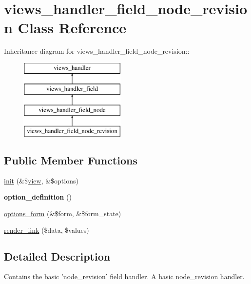 \hypertarget{classviews__handler__field__node__revision}{
\section{views\_\-handler\_\-field\_\-node\_\-revision Class Reference}
\label{classviews__handler__field__node__revision}
}
Inheritance diagram for views\_\-handler\_\-field\_\-node\_\-revision::\begin{figure}[H]
\begin{center}
\leavevmode
\includegraphics[height=4cm]{classviews__handler__field__node__revision}
\end{center}
\end{figure}
\subsection*{Public Member Functions}
\begin{DoxyCompactItemize}
\item 
\hyperlink{classviews__handler__field__node__revision_aa89b3130f87bc8811d777a29f8e4468c}{init} (\&\$\hyperlink{classview}{view}, \&\$options)
\item 
\hypertarget{classviews__handler__field__node__revision_af690516a09619b86cf181f6e1db377bc}{
{\bfseries option\_\-definition} ()}
\label{classviews__handler__field__node__revision_af690516a09619b86cf181f6e1db377bc}

\item 
\hyperlink{classviews__handler__field__node__revision_a81c730d40af84b9309664ae8c7992429}{options\_\-form} (\&\$form, \&\$form\_\-state)
\item 
\hyperlink{classviews__handler__field__node__revision_aefde40c1e00a13cfdf184f31ff07c25b}{render\_\-link} (\$data, \$values)
\end{DoxyCompactItemize}


\subsection{Detailed Description}
Contains the basic 'node\_\-revision' field handler. A basic node\_\-revision handler. 

